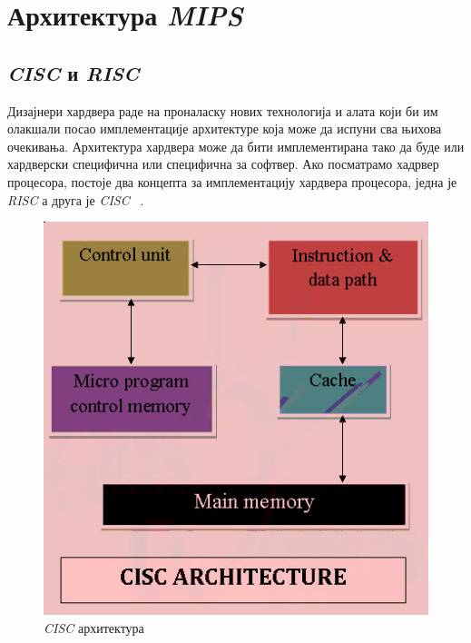 \documentclass[12pt,oneside]{memoir}
\begin{document}



\chapter{Архитектура \textit{MIPS}}
\label{chp:mips}
\section{\textit{CISC} и \textit{RISC}}

\indent Дизајнери хардвера раде на проналаску нових технологија и алата који би им олакшали посао имплементације архитектуре која може да испуни сва њихова очекивања. Архитектура хардвера може да бити имплементирана тако да буде или хардверски специфична или специфична за софтвер. Ако посматрамо хадрвер процесора, постоје два концепта за имплементацију хардвера процесора, једна је \textit{RISC} а друга је \textit{CISC} ~\cite{rcRef}.

\begin{figure}[h!]
\begin{center}
\includegraphics[scale=0.75]{slika22.jpg}
\end{center}
\caption{\textit{CISC} архитектура}
\label{fig:main}
\end{figure}
\end{document}
